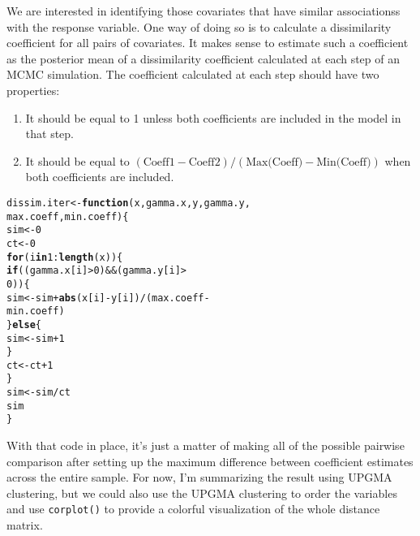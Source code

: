 \documentclass[12pt]{article}\usepackage[]{graphicx}\usepackage[]{color}
\makeatletter
\newcommand{\hlnum}[1]{\textcolor[rgb]{0.686,0.059,0.569}{#1}}%
\newcommand{\hlopt}[1]{\textcolor[rgb]{0,0,0}{#1}}%
\newcommand{\hlstd}[1]{\textcolor[rgb]{0.345,0.345,0.345}{#1}}%
\newcommand{\hlkwa}[1]{\textcolor[rgb]{0.161,0.373,0.58}{\textbf{#1}}}%
\newcommand{\hlkwb}[1]{\textcolor[rgb]{0.69,0.353,0.396}{#1}}%
\newcommand{\hlkwc}[1]{\textcolor[rgb]{0.333,0.667,0.333}{#1}}%
\newcommand{\hlkwd}[1]{\textcolor[rgb]{0.737,0.353,0.396}{\textbf{#1}}}%
\newenvironment{kframe}{%
 \def\at@end@of@kframe{}%
 \ifinner\ifhmode%
  \def\at@end@of@kframe{\end{minipage}}%
  \begin{minipage}{\columnwidth}%
 \fi\fi%
 \def\FrameCommand##1{\hskip\@totalleftmargin \hskip-\fboxsep
 \colorbox{shadecolor}{##1}\hskip-\fboxsep
     \hskip-\linewidth \hskip-\@totalleftmargin \hskip\columnwidth}%
 \MakeFramed {\advance\hsize-\width
   \@totalleftmargin\z@ \linewidth\hsize
   \@setminipage}}%
 {\par\unskip\endMakeFramed%
 \at@end@of@kframe}
\newenvironment{knitrout}{}{} %
\makeatother
\begin{document}
We are interested in identifying those covariates that have similar
associationss with the response variable. One way of doing so is to
calculate a dissimilarity coefficient for all pairs of covariates. It
makes sense to estimate such a coefficient as the posterior mean of a
dissimilarity coefficient calculated at each step of an MCMC
simulation. The coefficient calculated at each step should have two
properties:

\begin{enumerate}

\item It should be equal to 1 unless both coefficients are included in
the model in that step.

\item It should be equal to $(\mbox{Coeff}1 -
\mbox{Coeff}2)/(\mbox{Max(Coeff)} - \mbox{Min(Coeff)})$ when both
coefficients are included.

\end{enumerate}

\begin{knitrout}
\color{fgcolor}\begin{kframe}
\begin{alltt}
\hlstd{dissim.iter} \hlkwb{<-} \hlkwa{function}\hlstd{(}\hlkwc{x}\hlstd{,} \hlkwc{gamma.x}\hlstd{,} \hlkwc{y}\hlstd{,} \hlkwc{gamma.y}\hlstd{,}
  \hlkwc{max.coeff}\hlstd{,} \hlkwc{min.coeff}\hlstd{) \{}
  \hlstd{sim} \hlkwb{<-} \hlnum{0}
  \hlstd{ct} \hlkwb{<-} \hlnum{0}
  \hlkwa{for} \hlstd{(i} \hlkwa{in} \hlnum{1}\hlopt{:}\hlkwd{length}\hlstd{(x)) \{}
    \hlkwa{if} \hlstd{((gamma.x[i]} \hlopt{>} \hlnum{0}\hlstd{)} \hlopt{&&} \hlstd{(gamma.y[i]} \hlopt{>}
      \hlnum{0}\hlstd{)) \{}
      \hlstd{sim} \hlkwb{<-} \hlstd{sim} \hlopt{+} \hlkwd{abs}\hlstd{(x[i]} \hlopt{-} \hlstd{y[i])}\hlopt{/}\hlstd{(max.coeff} \hlopt{-}
        \hlstd{min.coeff)}
    \hlstd{\}} \hlkwa{else} \hlstd{\{}
      \hlstd{sim} \hlkwb{<-} \hlstd{sim} \hlopt{+} \hlnum{1}
    \hlstd{\}}
    \hlstd{ct} \hlkwb{<-} \hlstd{ct} \hlopt{+} \hlnum{1}
  \hlstd{\}}
  \hlstd{sim} \hlkwb{<-} \hlstd{sim}\hlopt{/}\hlstd{ct}
  \hlstd{sim}
\hlstd{\}}
\end{alltt}
\end{kframe}
\end{knitrout}

With that code in place, it's just a matter of making all of the
possible pairwise comparison after setting up the maximum difference
between coefficient estimates across the entire sample. For now, I'm
summarizing the result using UPGMA clustering, but we could also use
the UPGMA clustering to order the variables and use {\tt corplot()} to
provide a colorful visualization of the whole distance matrix.
\end{document}
